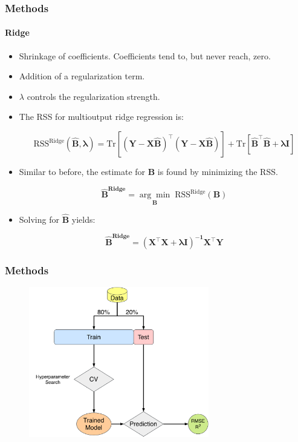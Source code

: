 \documentclass{beamer}
\begin{document}
\begin{frame}
	\frametitle{Methods}
\framesubtitle{Ridge}
\begin{itemize}


\pause
\item Shrinkage of coefficients. Coefficients tend to, but never reach, zero.
\pause
\item Addition of a regularization term.
\pause
\item $\lambda$ controls the regularization strength.
\pause
\item The RSS for multioutput ridge regression is:

\begin{equation} 
	\label{eqn:rss-ridge}
	\text{RSS}^{\text{Ridge}}(\mathbf{\hat{B}, \boldsymbol{\lambda} }) = \text{Tr} [\mathbf{(Y-X\hat{B})^\intercal (Y-X\hat{B})}] + \text{Tr}[\mathbf{\hat{B}^\intercal \hat{B}+ \boldsymbol{\lambda} I}]
\end{equation}
\pause
\item Similar to before, the estimate for $\mathbf{B}$ is found by minimizing the RSS.

\begin{equation}
	\label{eqn:ridgebetahat}
	\mathbf{\hat{B}^\text{Ridge}} = \underset{\mathbf{B}}{\arg\min} 	\; \text{RSS}^{\text{Ridge}}(\mathbf{B})
\end{equation}	
\pause
\item Solving for $\mathbf{\hat{B}}$ yields:

\begin{equation}
	\label{eqn:ridgebetahat2}
	\mathbf{\hat{B}^\text{Ridge}} = \mathbf{(X^\intercal X + \boldsymbol{\lambda}  I )^{-1} X^\intercal Y}
\end{equation}

\end{itemize}

\end{frame}

\begin{frame}
	\frametitle{Methods}
	
	\begin{figure}[h]
		\includegraphics[width=0.7\textwidth]{../../figures/methods-schema.pdf}
	\end{figure}
	
\end{frame}
\end{document}
